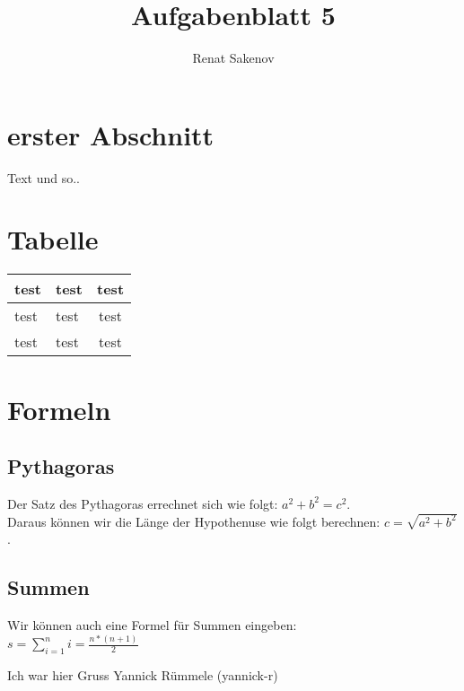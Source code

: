 \documentclass[30p]{article}
\author{Renat Sakenov}
\title{Aufgabenblatt 5 }
\begin{document}
\maketitle

\section{erster Abschnitt} 
Text und so.. \\

\section{Tabelle}
\begin{tabular}[]{| p{3cm} | p{3cm} | c |}
test &  test & test\\  \hline
test &  test & test\\
test &  test & test\\

\end{tabular}


\section{Formeln}
\subsection{Pythagoras}

Der Satz des Pythagoras errechnet sich wie folgt: $a^2+b^2 = c^2$.\\ 
Daraus können wir die Länge der Hypothenuse wie folgt berechnen: $c = \sqrt{a^2+b^2}$.

\subsection{Summen}
Wir können auch eine Formel für Summen eingeben: \\
$s = \sum_{i=1}^{n} i = \frac{n * (n+1)}{2}$

Ich war hier Gruss Yannick Rümmele (yannick-r)
   
\end{document}
